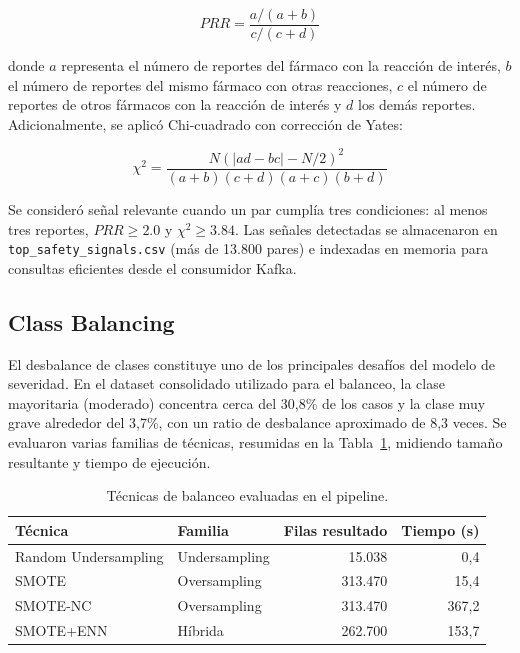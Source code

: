 \documentclass[12pt,a4paper]{article}
\begin{document}
\begin{equation}
PRR = \frac{a/(a+b)}{c/(c+d)}
\end{equation}

donde \(a\) representa el número de reportes del fármaco con la reacción de interés, \(b\) el número de reportes del mismo fármaco con otras reacciones, \(c\) el número de reportes de otros fármacos con la reacción de interés y \(d\) los demás reportes. Adicionalmente, se aplicó Chi-cuadrado con corrección de Yates:

\begin{equation}
\chi^2 = \frac{N(|ad-bc|-N/2)^2}{(a+b)(c+d)(a+c)(b+d)}
\end{equation}

Se consideró señal relevante cuando un par cumplía tres condiciones: al menos tres reportes, \(PRR \geq 2.0\) y \(\chi^2 \geq 3.84\). Las señales detectadas se almacenaron en \texttt{top\_safety\_signals.csv} (más de 13.800 pares) e indexadas en memoria para consultas eficientes desde el consumidor Kafka.

\subsection{Class Balancing}
El desbalance de clases constituye uno de los principales desafíos del modelo de severidad. En el dataset consolidado utilizado para el balanceo, la clase mayoritaria (moderado) concentra cerca del 30,8\% de los casos y la clase muy grave alrededor del 3,7\%, con un ratio de desbalance aproximado de 8,3 veces. Se evaluaron varias familias de técnicas, resumidas en la Tabla~\ref{tab:balancing}, midiendo tamaño resultante y tiempo de ejecución.

\begin{table}[H]
\centering
\caption{Técnicas de balanceo evaluadas en el pipeline.}
\label{tab:balancing}
\small
\begin{tabular}{@{}llrr@{}}
\toprule
\textbf{Técnica} & \textbf{Familia} & \textbf{Filas resultado} & \textbf{Tiempo (s)} \\
\midrule
Random Undersampling & Undersampling & 15.038 & 0,4 \\
SMOTE & Oversampling & 313.470 & 15,4 \\
SMOTE-NC & Oversampling & 313.470 & 367,2 \\
SMOTE+ENN & Híbrida & 262.700 & 153,7 \\
\bottomrule
\end{tabular}
\end{table}
\end{document}
